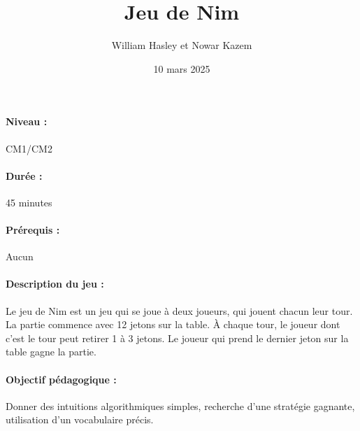 \documentclass[12pt, a4paper]{article}
\begin{document}
	
	\title{Jeu de Nim}
	\author{William Hasley et Nowar Kazem}
	\date{10 mars 2025}
	\maketitle
	
	\paragraph*{Niveau :} CM1/CM2 
	\paragraph*{Durée :} 45 minutes
	\paragraph*{Prérequis :} Aucun
	\paragraph*{Description du jeu :}
	Le jeu de Nim est un jeu qui se joue à deux joueurs, qui jouent chacun leur tour. La partie commence avec 12 jetons sur la table. 
	À chaque tour, le joueur dont c'est le tour peut retirer 1 à 3 jetons. Le joueur qui prend le dernier jeton sur la table gagne la partie.
	
	\paragraph*{Objectif pédagogique :}
	Donner des intuitions algorithmiques simples, recherche d'une stratégie gagnante, utilisation d'un vocabulaire précis.
	
\end{document}
